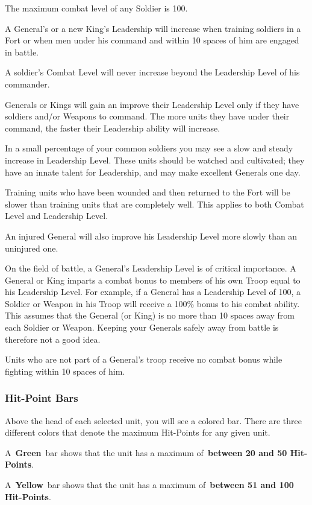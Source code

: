 The maximum combat level of any Soldier is 100.

A General’s or a new King’s Leadership will increase when training soldiers in a Fort or when men under his command and within 10 spaces of him are engaged in battle.

A soldier’s Combat Level will never increase beyond the Leadership Level of his commander.

Generals or Kings will gain an improve their Leadership Level only if they have soldiers and/or Weapons to command. The more units they have under their command, the faster their Leadership ability will increase.

In a small percentage of your common soldiers you may see a slow and steady increase in Leadership Level. These units should be watched and cultivated; they have an innate talent for Leadership, and may make excellent Generals one day.

Training units who have been wounded and then returned to the Fort will be slower than training units that are completely well. This applies to both Combat Level and Leadership Level.

An injured General will also improve his Leadership Level more slowly than an uninjured one.

On the field of battle, a General’s Leadership Level is of critical importance. A General or King imparts a combat bonus to members of his own Troop equal to his Leadership Level. For example, if a General has a Leadership Level of 100, a Soldier or Weapon in his Troop will receive a 100\% bonus to his combat ability. This assumes that the General (or King) is no more than 10 spaces away from each Soldier or Weapon. Keeping your Generals safely away from battle is therefore not a good idea.

Units who are not part of a General’s troop receive no combat bonus while fighting within 10 spaces of him.

\subsubsection{Hit-Point Bars}

Above the head of each selected unit, you will see a colored bar. There are three different colors that denote the maximum Hit-Points for any given unit.

A \textbf{Green} bar shows that the unit has a maximum of \textbf{between 20 and 50 Hit-Points}.

A \textbf{Yellow} bar shows that the unit has a maximum of \textbf{between 51 and 100 Hit-Points}.

